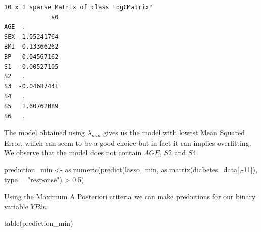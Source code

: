 \documentclass[
]{article}
\newenvironment{Shaded}{\begin{snugshade}}{\end{snugshade}}
\newcommand{\AttributeTok}[1]{\textcolor[rgb]{0.77,0.63,0.00}{#1}}
\newcommand{\DecValTok}[1]{\textcolor[rgb]{0.00,0.00,0.81}{#1}}
\newcommand{\FloatTok}[1]{\textcolor[rgb]{0.00,0.00,0.81}{#1}}
\newcommand{\FunctionTok}[1]{\textcolor[rgb]{0.00,0.00,0.00}{#1}}
\newcommand{\NormalTok}[1]{#1}
\newcommand{\OtherTok}[1]{\textcolor[rgb]{0.56,0.35,0.01}{#1}}
\newcommand{\SpecialCharTok}[1]{\textcolor[rgb]{0.00,0.00,0.00}{#1}}
\newcommand{\StringTok}[1]{\textcolor[rgb]{0.31,0.60,0.02}{#1}}
\begin{document}
\begin{Shaded}
\end{Shaded}

\begin{verbatim}
10 x 1 sparse Matrix of class "dgCMatrix"
             s0
AGE  .         
SEX -1.05241764
BMI  0.13366262
BP   0.04567162
S1  -0.00527105
S2   .         
S3  -0.04687441
S4   .         
S5   1.60762089
S6   .         
\end{verbatim}

The model obtained using \(\lambda_{min}\) gives us the model with
lowest Mean Squared Error, which can seem to be a good choice but in
fact it can implies overfitting. We observe that the model does not
contain \(AGE\), \(S2\) and \(S4\).

\begin{Shaded}
\begin{Highlighting}[]
\NormalTok{prediction\_min }\OtherTok{\textless{}{-}} \FunctionTok{as.numeric}\NormalTok{(}\FunctionTok{predict}\NormalTok{(lasso\_min, }\FunctionTok{as.matrix}\NormalTok{(diabetes\_data[,}\SpecialCharTok{{-}}\DecValTok{11}\NormalTok{]), }\AttributeTok{type =} \StringTok{"response"}\NormalTok{) }\SpecialCharTok{\textgreater{}} \FloatTok{0.5}\NormalTok{)}
\end{Highlighting}
\end{Shaded}

Using the Maximum A Posteriori criteria we can make predictions for our
binary variable \(YBin\):

\begin{Shaded}
\begin{Highlighting}[]
\FunctionTok{table}\NormalTok{(prediction\_min)}
\end{Highlighting}
\end{Shaded}
\end{document}
